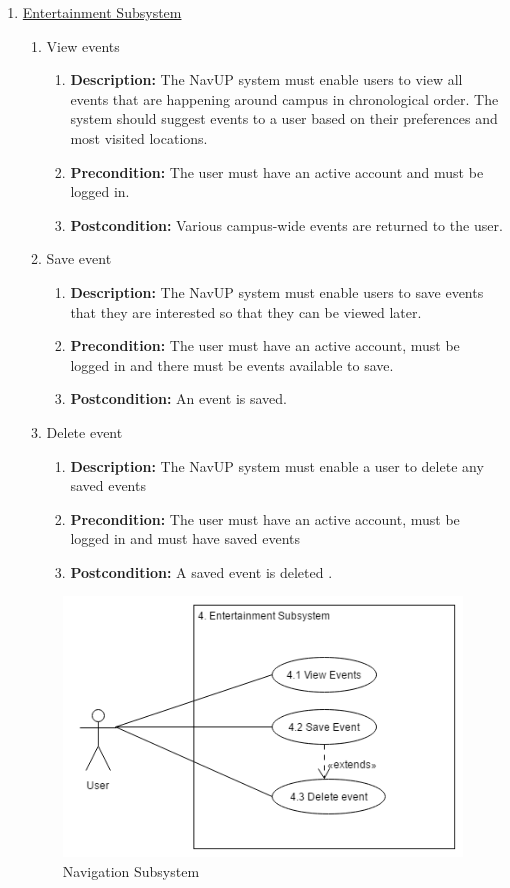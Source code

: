 \documentclass{article}
\begin{document}
\begin{enumerate}
	
	\item \underline{Entertainment Subsystem}
			\begin{enumerate}
		\item View events
		\begin{enumerate}
			\item \textbf{Description:} The NavUP system must enable users to view all events that are happening around campus in chronological order. The system should suggest events to a user based on their preferences and most visited locations.
			\item \textbf{Precondition:} The user must have an active account and must be logged in.
			\item \textbf{Postcondition:} Various campus-wide events are returned to the user.\newline
		\end{enumerate}
		
		\item Save event
		\begin{enumerate}
			\item \textbf{Description:} The NavUP system must enable users to save events that they are interested so that they can be viewed later.
			\item \textbf{Precondition:} The user must have an active account, must be logged in and there must be events available to save.
			\item \textbf{Postcondition:} An event is saved.\newline
		\end{enumerate}
		
		\item Delete event
		\begin{enumerate}
			\item \textbf{Description:} The NavUP system must enable a user to delete any saved events
			\item \textbf{Precondition:} The user must have an active account, must be logged in and must have saved events
			\item \textbf{Postcondition:} A saved event is deleted .\newline
		\end{enumerate}
	\end{enumerate}
	\begin{figure}[h!]
		\includegraphics[scale=0.5]{Entertainment_Subsystem.png}
		\caption{Navigation Subsystem}	
	\end{figure}	
	

\end{enumerate}
\end{document}
